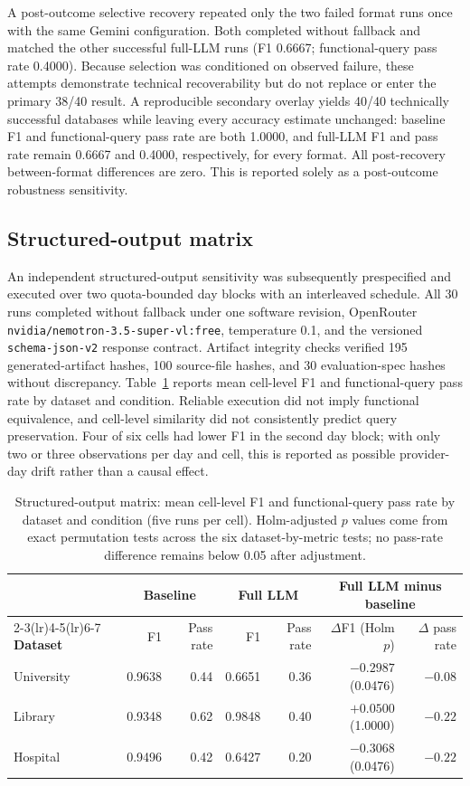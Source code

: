 \documentclass[11pt,a4paper]{article}
\begin{document}
A post-outcome selective recovery repeated only the two failed format runs once with the same Gemini configuration. Both completed without fallback and matched the other successful full-LLM runs (F1 0.6667; functional-query pass rate 0.4000). Because selection was conditioned on observed failure, these attempts demonstrate technical recoverability but do not replace or enter the primary 38/40 result. A reproducible secondary overlay yields 40/40 technically successful databases while leaving every accuracy estimate unchanged: baseline F1 and functional-query pass rate are both 1.0000, and full-LLM F1 and pass rate remain 0.6667 and 0.4000, respectively, for every format. All post-recovery between-format differences are zero. This is reported solely as a post-outcome robustness sensitivity.

\subsection{Structured-output matrix}
An independent structured-output sensitivity was subsequently prespecified and executed over two quota-bounded day blocks with an interleaved schedule. All 30 runs completed without fallback under one software revision, OpenRouter \texttt{nvidia/nemotron-3.5-super-vl:free}, temperature 0.1, and the versioned \texttt{schema-json-v2} response contract. Artifact integrity checks verified 195 generated-artifact hashes, 100 source-file hashes, and 30 evaluation-spec hashes without discrepancy. Table~\ref{tab:rq2-cells} reports mean cell-level F1 and functional-query pass rate by dataset and condition. Reliable execution did not imply functional equivalence, and cell-level similarity did not consistently predict query preservation. Four of six cells had lower F1 in the second day block; with only two or three observations per day and cell, this is reported as possible provider-day drift rather than a causal effect.

\begin{table}[htbp]
\centering
\small
\begin{tabular}{lrrrrrr}
\toprule
 & \multicolumn{2}{c}{\textbf{Baseline}} & \multicolumn{2}{c}{\textbf{Full LLM}} & \multicolumn{2}{c}{\textbf{Full LLM minus baseline}}\\
\cmidrule(lr){2-3}\cmidrule(lr){4-5}\cmidrule(lr){6-7}
\textbf{Dataset} & F1 & Pass rate & F1 & Pass rate & $\Delta$F1 (Holm $p$) & $\Delta$ pass rate\\
\midrule
University & 0.9638 & 0.44 & 0.6651 & 0.36 & $-0.2987$ (0.0476) & $-0.08$\\
Library & 0.9348 & 0.62 & 0.9848 & 0.40 & $+0.0500$ (1.0000) & $-0.22$\\
Hospital & 0.9496 & 0.42 & 0.6427 & 0.20 & $-0.3068$ (0.0476) & $-0.22$\\
\bottomrule
\end{tabular}
\caption{Structured-output matrix: mean cell-level F1 and functional-query pass rate by dataset and condition (five runs per cell). Holm-adjusted $p$ values come from exact permutation tests across the six dataset-by-metric tests; no pass-rate difference remains below 0.05 after adjustment.}
\label{tab:rq2-cells}
\end{table}
\end{document}
